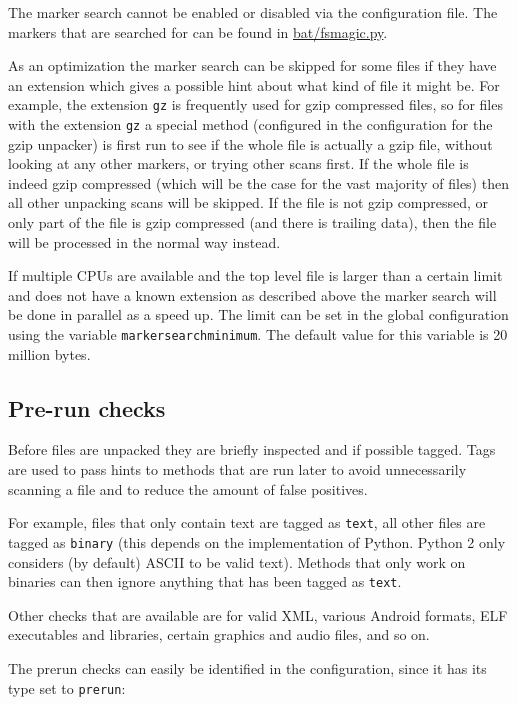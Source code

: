 \documentclass[10pt,a4paper]{article}
\begin{document}
The marker search cannot be enabled or disabled via the configuration file. The
markers that are searched for can be found in \url{bat/fsmagic.py}.

As an optimization the marker search can be skipped for some files if they
have an extension which gives a possible hint about what kind of file it might
be. For example, the extension \texttt{gz} is frequently used for gzip
compressed files, so for files with the extension \texttt{gz} a special method
(configured in the configuration for the gzip unpacker) is first run to see if
the whole file is actually a gzip file, without looking at any other markers,
or trying other scans first. If the whole file is indeed gzip compressed (which
will be the case for the vast majority of files) then all other unpacking scans
will be skipped. If the file is not gzip compressed, or only part of the file
is gzip compressed (and there is trailing data), then the file will be
processed in the normal way instead.

If multiple CPUs are available and the top level file is larger than a certain
limit and does not have a known extension as described above the marker search
will be done in parallel as a speed up. The limit can be set in the global
configuration using the variable \texttt{markersearchminimum}. The default
value for this variable is 20 million bytes.

\subsection{Pre-run checks}

Before files are unpacked they are briefly inspected and if possible tagged.
Tags are used to pass hints to methods that are run later to avoid unnecessarily
scanning a file and to reduce the amount of false positives.

For example, files that only contain text are tagged as \texttt{text}, all other
files are tagged as \texttt{binary} (this depends on the implementation of
Python. Python 2 only considers (by default) ASCII to be valid text). Methods
that only work on binaries can then ignore anything that has been tagged as
\texttt{text}.

Other checks that are available are for valid XML, various Android formats,
ELF executables and libraries, certain graphics and audio files, and so on.

The prerun checks can easily be identified in the configuration, since it has
its type set to \texttt{prerun}:
\end{document}
